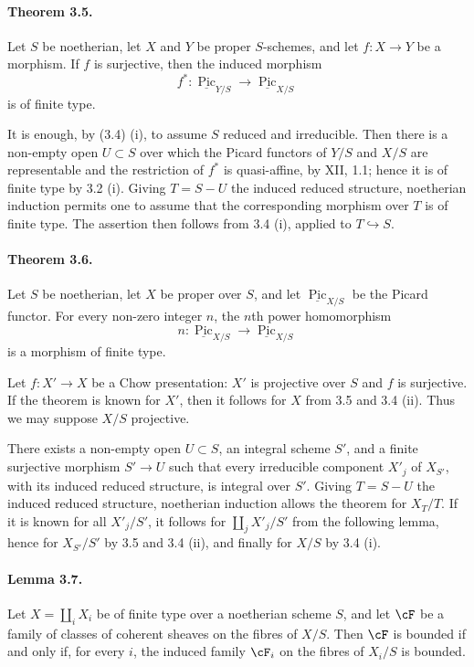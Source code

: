 \documentclass[11pt]{article}
\theoremstyle{plain}
\theoremstyle{definition}
\theoremstyle{remark}
\DeclareMathOperator{\Pic}{Pic}
\newcommand{\longto}{\longrightarrow}
\begin{document}
\paragraph{Theorem 3.5.}
Let $S$ be noetherian, let $X$ and $Y$ be proper $S$-schemes, and let $f:X\to Y$ be a morphism. If $f$ is surjective, then the induced morphism
\[
f^*:\underline{\Pic}_{Y/S}\longto\underline{\Pic}_{X/S}
\]
is of finite type.

It is enough, by (3.4) (i), to assume $S$ reduced and irreducible. Then there is a non-empty open $U\subset S$ over which the Picard functors of $Y/S$ and $X/S$ are representable and the restriction of $f^*$ is quasi-affine, by XII, 1.1; hence it is of finite type by 3.2 (i). Giving $T=S-U$ the induced reduced structure, noetherian induction permits one to assume that the corresponding morphism over $T$ is of finite type. The assertion then follows from 3.4 (i), applied to $T\hookrightarrow S$.

\paragraph{Theorem 3.6.}
Let $S$ be noetherian, let $X$ be proper over $S$, and let $\underline{\Pic}_{X/S}$ be the Picard functor. For every non-zero integer $n$, the $n$th power homomorphism
\[
n:\underline{\Pic}_{X/S}\longto \underline{\Pic}_{X/S}
\]
is a morphism of finite type.

Let $f:X'\to X$ be a Chow presentation: $X'$ is projective over $S$ and $f$ is surjective. If the theorem is known for $X'$, then it follows for $X$ from 3.5 and 3.4 (ii). Thus we may suppose $X/S$ projective.

There exists a non-empty open $U\subset S$, an integral scheme $S'$, and a finite surjective morphism $S'\to U$ such that every irreducible component $X'_j$ of $X_{S'}$, with its induced reduced structure, is integral over $S'$. Giving $T=S-U$ the induced reduced structure, noetherian induction allows the theorem for $X_T/T$. If it is known for all $X'_j/S'$, it follows for $\coprod_j X'_j/S'$ from the following lemma, hence for $X_{S'}/S'$ by 3.5 and 3.4 (ii), and finally for $X/S$ by 3.4 (i).

\paragraph{Lemma 3.7.}
Let $X=\coprod_i X_i$ be of finite type over a noetherian scheme $S$, and let $\cF$ be a family of classes of coherent sheaves on the fibres of $X/S$. Then $\cF$ is bounded if and only if, for every $i$, the induced family $\cF_i$ on the fibres of $X_i/S$ is bounded.
\end{document}
